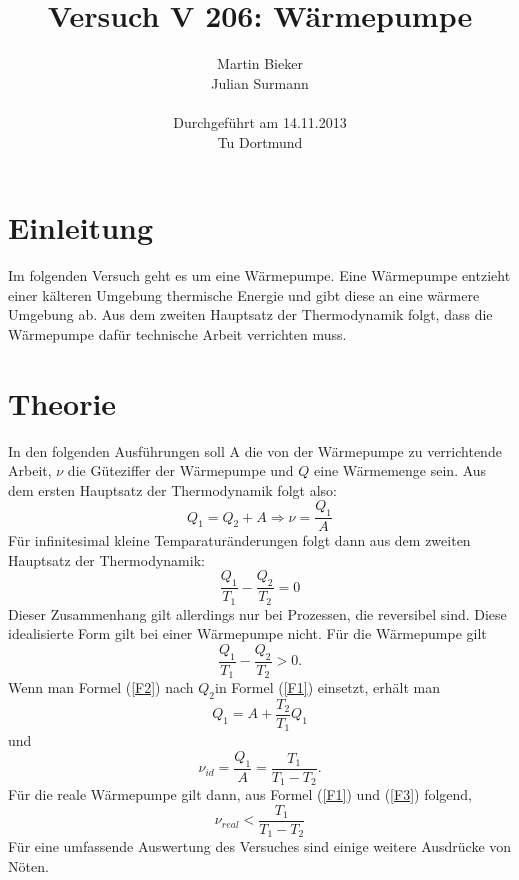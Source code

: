 \documentclass[11pt]{article}
\title{\textbf{Versuch V 206: Wärmepumpe}}
\author{Martin Bieker\\
		Julian Surmann\\
		\\
		Durchgef\"{u}hrt am 14.11.2013\\
		Tu Dortmund}
\date{}
\begin{document}
\renewcommand\tablename{Tabelle}
\renewcommand\figurename{Abbildung}
\maketitle
\thispagestyle{empty}
\newpage
\clearpage
\setcounter{page}{1}


\section{Einleitung}
Im folgenden Versuch geht es um eine Wärmepumpe. Eine Wärmepumpe entzieht einer kälteren Umgebung thermische Energie und gibt diese an eine wärmere Umgebung ab. Aus dem zweiten Hauptsatz der Thermodynamik folgt, dass die Wärmepumpe dafür technische Arbeit verrichten muss.
\section{Theorie}
In den folgenden Ausführungen soll A die von der Wärmepumpe zu verrichtende Arbeit, $\nu$ die Güteziffer der Wärmepumpe und $Q$ eine Wärmemenge sein. Aus dem ersten Hauptsatz der Thermodynamik folgt also:
\begin{equation}
\label{F1}
Q_1 = Q_2 + A \Rightarrow \nu = \frac{Q_1}{A}
\end{equation}
Für infinitesimal kleine Temparaturänderungen folgt dann aus dem zweiten Hauptsatz der Thermodynamik:
\begin{equation}
\label{F2}
\frac{Q_1}{T_1} - \frac{Q_2}{T_2} = 0
\end{equation}
Dieser Zusammenhang gilt allerdings nur bei Prozessen, die reversibel sind. Diese idealisierte Form gilt bei einer Wärmepumpe nicht. Für die Wärmepumpe gilt
\begin{equation}
\label{F3}
\frac{Q_1}{T_1} - \frac{Q_2}{T_2} > 0.
\end{equation}
Wenn man Formel (\ref{F2}) nach $Q_2$in Formel (\ref{F1}) einsetzt, erhält man
\begin{equation}
\label{F4}
Q_1 = A + \frac{T_2}{T_1} Q_1
\end{equation}
und
\begin{equation}
\label{F5}
\nu_{id} = \frac{Q_1}{A} = \frac{T_1}{T_1-T_2}.
\end{equation}
Für die reale Wärmepumpe gilt dann, aus Formel (\ref{F1}) und (\ref{F3}) folgend,
\begin{equation}
\label{F6}
\nu_{real} < \frac{T_1}{T_1-T_2}
\end{equation}
Für eine umfassende Auswertung des Versuches sind einige weitere Ausdrücke von Nöten.
\end{document}
